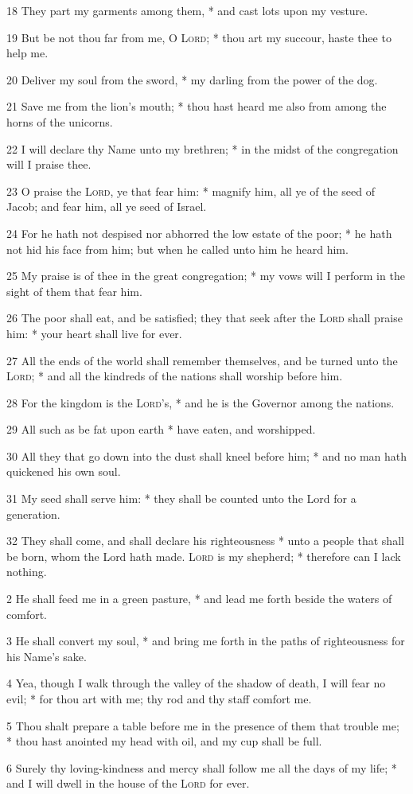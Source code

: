 18 They part my garments among them, * and cast lots upon my vesture.\par
19 But be not thou far from me, O {\textsc{Lord}}; * thou art my succour, haste thee to help me.\par
20 Deliver my soul from the sword, * my darling from the power of the dog.\par
21 Save me from the lion's mouth; * thou hast heard me also from among the horns of the unicorns.\par
22 I will declare thy Name unto my brethren; * in the midst of the congregation will I praise thee.\par
23 O praise the {\textsc{Lord}}, ye that fear him: * magnify him, all ye of the seed of Jacob; and fear him, all ye seed of Israel.\par
24 For he hath not despised nor abhorred the low estate of the poor; * he hath not hid his face from him; but when he called unto him he heard him.\par
25 My praise is of thee in the great congregation; * my vows will I perform in the sight of them that fear him.\par
26 The poor shall eat, and be satisfied; they that seek after the {\textsc{Lord}} shall praise him: * your heart shall live for ever.\par
27 All the ends of the world shall remember themselves, and be turned unto the {\textsc{Lord}}; * and all the kindreds of the nations shall worship before him.\par
28 For the kingdom is the {\textsc{Lord}}'s, * and he is the Governor among the nations.\par
29 All such as be fat upon earth * have eaten, and worshipped.\par
30 All they that go down into the dust shall kneel before him; * and no man hath quickened his own soul.\par
31 My seed shall serve him: * they shall be counted unto the Lord for a generation.\par
32 They shall come, and shall declare his righteousness * unto a people that shall be born, whom the Lord hath made.
 {\textsc{Lord}} is my shepherd; * therefore can I lack nothing.\par
2 He shall feed me in a green pasture, * and lead me forth beside the waters of comfort.\par
3 He shall convert my soul, * and bring me forth in the paths of righteousness for his Name's sake.\par
4 Yea, though I walk through the valley of the shadow of death, I will fear no evil; * for thou art with me; thy rod and thy staff comfort me.\par
5 Thou shalt prepare a table before me in the presence of them that trouble me; * thou hast anointed my head with oil, and my cup shall be full.\par
6 Surely thy loving-kindness and mercy shall follow me all the days of my life; * and I will dwell in the house of the {\textsc{Lord}} for ever.
